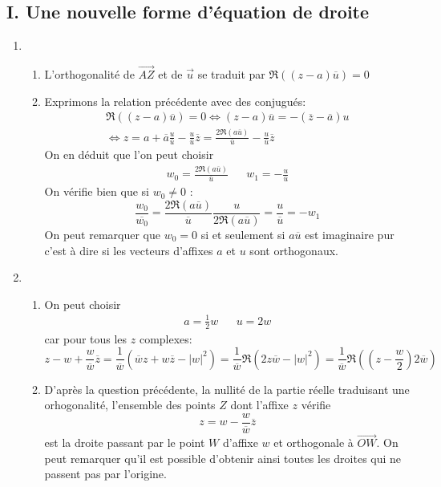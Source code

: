 \subsection*{I. Une nouvelle forme d'équation de droite}
\begin{enumerate}
 \item
\begin{enumerate}
\item L'orthogonalité de $\overrightarrow{AZ}$ et de $\overrightarrow u$ se traduit par $ \Re\left( (z-a)\overline{u}\right) = 0$
\item Exprimons la relation précédente avec des conjugués:
\begin{multline*}
 \Re\left( (z-a)\overline{u}\right) = 0\Leftrightarrow
(z-a)\overline{u} = - (\overline{z}-\overline{a})u \\ \Leftrightarrow
z = a + \overline{a}\frac{u}{\overline{u}} - \frac{u}{\overline{u}}\overline{z} 
= \frac{2\Re(a\overline{u})}{\overline{u}} - \frac{u}{\overline{u}}\overline{z}
\end{multline*}
On en déduit que l'on peut choisir 
\begin{align*}
 w_0 = \frac{2\Re(a\overline{u})}{\overline{u}} & & w_1 = -\frac{u}{\overline{u}}
\end{align*}
On vérifie bien que si $w_0\neq 0$ :
\begin{displaymath}
 \frac{w_0}{\overline{w_0}}= \frac{2\Re(a\overline{u})}{\overline{u}} \frac{u}{2\Re(a\overline{u})} = \frac{u}{\overline{u}} = -w_1
\end{displaymath}
On peut remarquer que $w_0=0$ si et seulement si $a\overline{u}$ est imaginaire pur c'est à dire si les vecteurs d'affixes $a$ et $u$ sont orthogonaux.
\end{enumerate}
\item
\begin{enumerate}
 \item On peut choisir
\begin{align*}
 a = \frac{1}{2}w & & u = 2w
\end{align*}
car pour tous les $z$ complexes:
\begin{displaymath}
 z-w+\frac{w}{\overline{w}}\overline{z} = 
\frac{1}{\overline{w}}\left(\overline{w}z+w\overline{z}-|w|^2 \right)
= \frac{1}{\overline{w}}\Re\left(2z\overline{w}-|w|^2 \right)
= \frac{1}{\overline{w}}\Re\left((z-\frac{w}{2})2\overline{w}\right)
\end{displaymath} 
 \item D'après la question précédente, la nullité de la partie réelle traduisant une orhogonalité, l'ensemble des points $Z$ dont l'affixe $z$ vérifie
\begin{displaymath}
 z = w -\frac{w}{\overline{w}}\overline{z}
\end{displaymath}
est la droite passant par le point $W$ d'affixe $w$ et orthogonale à $\overrightarrow{OW}$. On peut remarquer qu'il est possible d'obtenir ainsi toutes les droites qui ne passent pas par l'origine.
\end{enumerate}

\end{enumerate}

